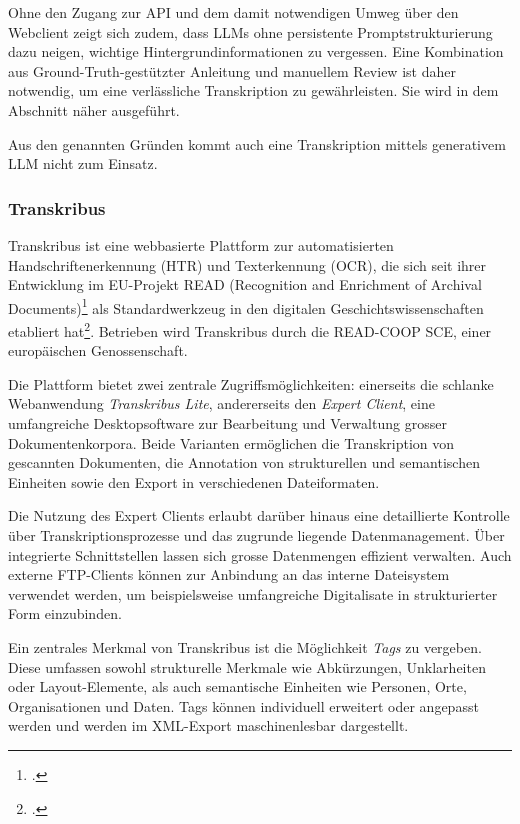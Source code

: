 \documentclass[12pt, a4paper, ngerman, bidi=default]{article}
\let\cite\footcite
\begin{document}
Ohne den Zugang zur API und dem damit notwendigen Umweg über den Webclient zeigt sich 
zudem, dass LLMs ohne persistente Promptstrukturierung dazu neigen, wichtige Hintergrundinformationen zu vergessen. 
Eine Kombination aus Ground-Truth-gestützter Anleitung und manuellem Review ist daher notwendig, um eine verlässliche Transkription zu gewährleisten. Sie wird in dem Abschnitt  näher ausgeführt.

Aus den genannten Gründen kommt auch eine Transkription mittels generativem LLM nicht zum Einsatz.

\subsubsection{Transkribus}\label{subsubsec:Transkribus}
Transkribus ist eine webbasierte Plattform zur automatisierten Handschriftenerkennung (HTR) und Texterkennung (OCR), die sich seit ihrer Entwicklung im EU-Projekt READ 
(Recognition and Enrichment of Archival Documents)\cite[vgl.][]{noauthor_recognition_nodate} als Standardwerkzeug in den digitalen Geschichtswissenschaften etabliert 
hat\cite[vgl.][]{muhlberger_transkribus_2019}. Betrieben wird Transkribus durch die READ-COOP SCE, einer europäischen Genossenschaft.

Die Plattform bietet zwei zentrale Zugriffsmöglichkeiten: einerseits die schlanke Webanwendung \textit{Transkribus Lite}, andererseits den \textit{Expert Client}, 
eine umfangreiche Desktopsoftware zur Bearbeitung und Verwaltung grosser Dokumentenkorpora. Beide Varianten ermöglichen die Transkription von gescannten Dokumenten, 
die Annotation von strukturellen und semantischen Einheiten sowie den Export in verschiedenen Dateiformaten. 

Die Nutzung des Expert Clients erlaubt darüber hinaus eine detaillierte Kontrolle über Transkriptionsprozesse und das zugrunde liegende Datenmanagement. 
Über integrierte Schnittstellen lassen sich grosse Datenmengen effizient verwalten. Auch externe FTP-Clients können zur Anbindung an das interne Dateisystem verwendet werden, 
um beispielsweise umfangreiche Digitalisate in strukturierter Form einzubinden.

Ein zentrales Merkmal von Transkribus ist die Möglichkeit \textit{Tags} zu vergeben. Diese umfassen sowohl strukturelle Merkmale wie Abkürzungen, Unklarheiten oder Layout-Elemente, 
als auch semantische Einheiten wie Personen, Orte, Organisationen und Daten. Tags können individuell erweitert oder angepasst werden und werden im XML-Export maschinenlesbar dargestellt.
\end{document}
